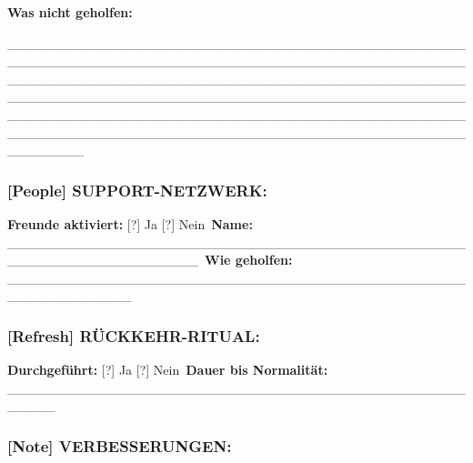 \textbf{Was nicht geholfen:}

\_\_\_\_\_\_\_\_\_\_\_\_\_\_\_\_\_\_\_\_\_\_\_\_\_\_\_\_\_\_\_\_\_\_\_\_\_\_\_\_\_\_\_\_\_\_\_\_\_\_\_\_\_\_\_\_\_\_\_\_\_\_\_\_\_\_\_\_\_\_\_\_\_\_\_\_\_\_\_\_\_\_\_\_\_\_\_\_\_\_\_\_\_\_\_\_\_\_\_\_\_\_\_\_\_\_\_\_\_\_\_\_\_\_\_\_\_\_\_\_\_\_\_\_\_\_\_\_\_\_\_\_\_\_\_\_\_\_\_\_\_\_\_\_\_\_\_\_\_\_\_\_\_\_\_\_\_\_\_\_\_\_\_\_\_\_\_\_\_\_\_\_\_\_\_\_\_\_\_\_\_\_\_\_\_\_\_\_\_\_\_\_\_\_\_\_\_\_\_\_\_\_\_\_\_\_\_\_\_\_\_\_\_\_\_\_\_\_\_\_\_\_\_\_\_\_\_\_\_\_\_\_\_\_\_\_\_\_\_\_\_\_\_\_\_\_\_\_\_\_\_\_\_\_\_\_\_\_\_\_\_\_\_\_\_\_\_\_\_\_\_\_\_\_\_\_\_\_\_\_\_\_\_\_\_\_\_\_\_\_\_\_\_\_\_\_

\hypertarget{support-netzwerk}{%
\subsubsection{\texorpdfstring{\textbf{[People] SUPPORT-NETZWERK:}}{[People] SUPPORT-NETZWERK:}}\label{support-netzwerk}}

\textbf{Freunde aktiviert:} [?] Ja [?] Nein\
\textbf{Name:} \_\_\_\_\_\_\_\_\_\_\_\_\_\_\_\_\_\_\_\_\_\_\_\_\_\_\_\_\_\_\_\_\_\_\_\_\_\_\_\_\_\_\_\_\_\_\_\_\_\_\_\_\_\_\_\_\_\_\_\_\_\_\_\_\_\_\_\_\
\textbf{Wie geholfen:} \_\_\_\_\_\_\_\_\_\_\_\_\_\_\_\_\_\_\_\_\_\_\_\_\_\_\_\_\_\_\_\_\_\_\_\_\_\_\_\_\_\_\_\_\_\_\_\_\_\_\_\_\_\_\_\_\_\_\_\_\_

\hypertarget{section-12}{%
\subsubsection{}\label{section-12}}

\hypertarget{ruxfcckkehr-ritual}{%
\subsubsection{\texorpdfstring{\textbf{[Refresh] RÜCKKEHR-RITUAL:}}{[Refresh] RÜCKKEHR-RITUAL:}}\label{ruxfcckkehr-ritual}}

\textbf{Durchgeführt:} [?] Ja [?] Nein\
\textbf{Dauer bis Normalität:} \_\_\_\_\_\_\_\_\_\_\_\_\_\_\_\_\_\_\_\_\_\_\_\_\_\_\_\_\_\_\_\_\_\_\_\_\_\_\_\_\_\_\_\_\_\_\_\_\_\_\_\_\_

\hypertarget{verbesserungen}{%
\subsubsection{\texorpdfstring{\textbf{[Note] VERBESSERUNGEN:}}{[Note] VERBESSERUNGEN:}}\label{verbesserungen}}

